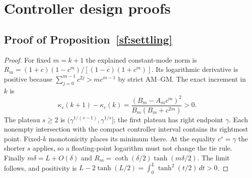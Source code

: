 \documentclass[journal]{IEEEtran}
\begin{document}
\section{Controller design proofs}\label{sf:control-proofs}
\subsection{Proof of Proposition~\ref{sf:settling}}
\begin{proof}\leavevmode
For fixed $m=k+1$ the explained constant-mode norm is
$R_m=(1+c)(1-c^m)/[(1-c)(1+c^m)]$.
Its logarithmic derivative is positive because
$\sum_{j=0}^{m-1}c^{2j}>mc^{m-1}$ by strict AM--GM.
The exact increment in $k$ is
\[
\kappa_c(k+1)-\kappa_c(k)
=\frac{(B_m-A_mc^m)^2}{B_m(B_m+c^{2m})}>0.
\]
The plateau $s\ge2$ is $(\gamma^{1/(s-1)},\gamma^{1/s}]$;
the first plateau has right endpoint $\gamma$.
Each nonempty intersection with the compact controller interval contains its
rightmost point. Fixed-$k$ monotonicity places its minimum there.
At the equality $c^s=\gamma$ the shorter $s$ applies, so a floating-point
logarithm must not change the tie rule.
Finally $m\delta=L+O(\delta)$ and
$R_m=\coth(\delta/2)\tanh(m\delta/2)$.
The limit follows, and positivity is
$L-2\tanh(L/2)=\int_0^L\tanh^2(t/2)\,dt>0$.
\end{proof}
\end{document}
